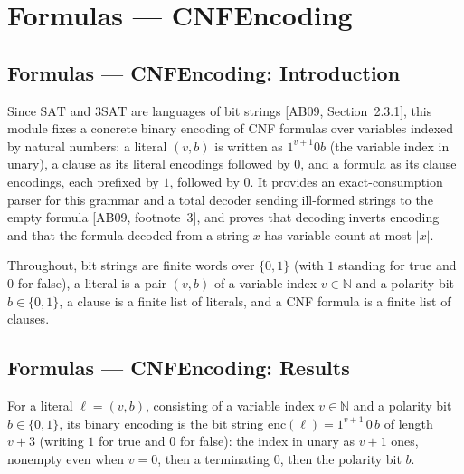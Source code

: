 \section{Formulas --- CNFEncoding}
\subsection*{Formulas --- CNFEncoding: Introduction}

Since $\mathrm{SAT}$ and $3\mathrm{SAT}$ are languages of bit strings [AB09, Section~2.3.1],
this module fixes a concrete binary encoding of CNF formulas over variables indexed by
natural numbers: a literal $(v,b)$ is written as $1^{v+1}0b$ (the variable index in unary),
a clause as its literal encodings followed by $0$, and a formula as its clause encodings,
each prefixed by $1$, followed by $0$. It provides an exact-consumption parser for this
grammar and a total decoder sending ill-formed strings to the empty formula
[AB09, footnote~3], and proves that decoding inverts encoding and that the formula decoded
from a string $x$ has variable count at most $|x|$.

Throughout, bit strings are finite words over $\{0,1\}$ (with $1$ standing for true and $0$
for false), a literal is a pair $(v,b)$ of a variable index $v \in \mathbb{N}$ and a polarity
bit $b \in \{0,1\}$, a clause is a finite list of literals, and a CNF formula is a finite
list of clauses.

\subsection*{Formulas --- CNFEncoding: Results}

\begin{definition}
\label{Std.Sat.CNF.serializeLit}
\leanok
For a literal $\ell = (v, b)$, consisting of a variable index $v \in \mathbb{N}$ and a
polarity bit $b \in \{0,1\}$, its binary encoding is the bit string
$\mathrm{enc}(\ell) = 1^{v+1}\,0\,b$ of length $v+3$ (writing $1$ for true and $0$ for
false): the index in unary as $v+1$ ones, nonempty even when $v = 0$, then a terminating
$0$, then the polarity bit $b$.
\end{definition}

